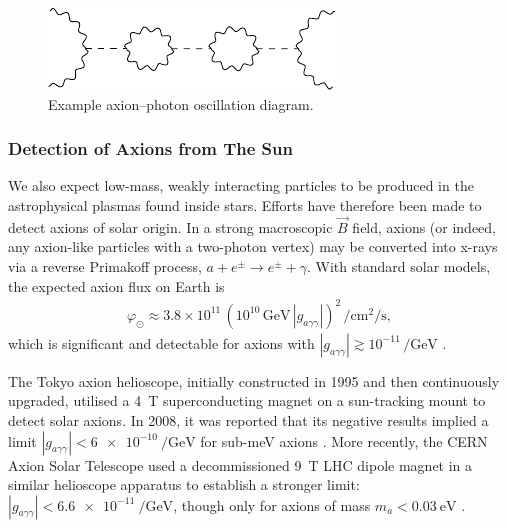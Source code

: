 

\begin{figure}
	\centering
	\includegraphics{diagrams/axion-photon-oscillation.pdf}
	\caption{Example axion--photon oscillation diagram.}
	\label{fig:axion-photon-oscillation}
\end{figure}


\subsubsection{Detection of Axions from The Sun}

We also expect low-mass, weakly interacting particles to be produced in the astrophysical plasmas found inside stars.
Efforts have therefore been made to detect axions of solar origin.
In a strong macroscopic $\vec B$ field, axions (or indeed, any axion-like particles with a two-photon vertex) may be converted into x-rays via a reverse Primakoff process, $a + e^\pm \to e^\pm + γ$.
With standard solar models, the expected axion flux on Earth is
\begin{align}
	φ_\odot \approx 3.8\times10^{11}\,(10^{10}\,\si{\giga\eV}\,|g_{aγγ}|)^2\,\si{\per\square\cm\per\s}
,\end{align}
which is significant and detectable for axions with $|g_{aγγ}| \gtrsim 10^{-11}\,\si{\per\giga\eV}$ \cite{solar-axion-flux_2007}.

The Tokyo axion helioscope, initially constructed in 1995 and then continuously upgraded, utilised a \SI{4}{\tesla} superconducting magnet on a sun-tracking mount to detect solar axions.
In 2008, it was reported that its negative results implied a limit $|g_{aγγ}| < \SI{6e-10}{\per\giga\eV}$ for sub-\si{\milli\eV} axions \cite{Tokyo-axion-helioscope_2008}.
More recently, the CERN Axion Solar Telescope used a decommissioned \SI{9}{\tesla} LHC dipole magnet in a similar helioscope apparatus to establish a stronger limit: $|g_{aγγ}| < \SI{6.6e-11}{\per\giga\eV}$, though only for axions of mass $m_a < \SI{0.03}{\eV}$ \cite{CAST-helioscope_2017}.


